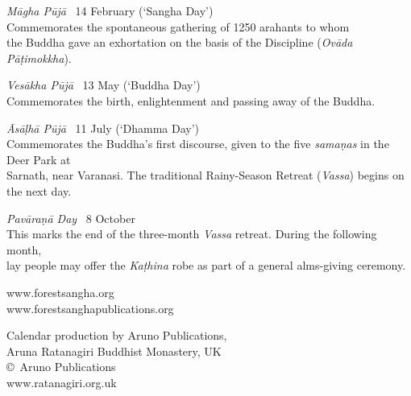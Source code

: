 {{\emph{Māgha Pūjā} \spacedcdot\ 14 February (`Sangha Day')\\
Commemorates the spontaneous gathering of 1250 arahants to whom\\
the Buddha gave an exhortation on the basis of the Discipline (\emph{Ovāda Pāṭimokkha}).

\emph{Vesākha Pūjā} \spacedcdot\ 13 May (`Buddha Day')\\
Commemorates the birth, enlightenment and passing away of the Buddha.

\emph{Āsāḷhā Pūjā} \spacedcdot\ 11 July (`Dhamma Day')\\
Commemorates the Buddha's first discourse, given to the five \emph{samaṇas} in the Deer Park at\\
Sarnath, near Varanasi. The traditional Rainy-Season Retreat (\emph{Vassa}) begins on the next day.

\emph{Pavāraṇā Day} \spacedcdot\ 8 October\\
This marks the end of the three-month \emph{Vassa} retreat. During the following month,\\
lay people may offer the \emph{Kaṭhina} robe as part of a general alms-giving ceremony.

\vspace{0.3\baselineskip}

www.forestsangha.org\\
www.forestsanghapublications.org

Calendar production by Aruno Publications,\\
Aruna Ratanagiri Buddhist Monastery, UK\\
\copyright\ Aruno Publications \the\year\\
www.ratanagiri.org.uk

\vspace{0.9\baselineskip}

}

}%


